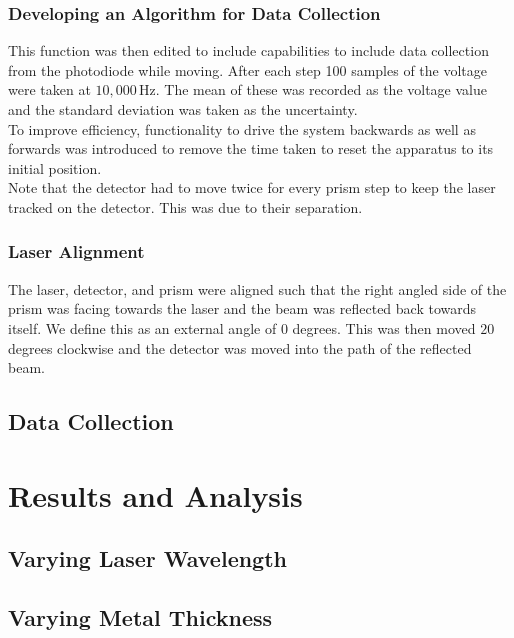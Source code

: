 \documentclass[%
reprint,
amsmath,amssymb,
aps,
]{revtex4-2}
\begin{document}
			\subsubsection{Developing an Algorithm for Data Collection}
				This function was then edited to include capabilities to include data collection from the photodiode while moving. After each step 100 samples of the voltage were taken at $10,000\,\text{Hz}$. The mean of these was recorded as the voltage value and the standard deviation was taken as the uncertainty.\\
				
				To improve efficiency, functionality to drive the system backwards as well as forwards was introduced to remove the time taken to reset the apparatus to its initial position.\\
				
				Note that the detector had to move twice for every prism step to keep the laser tracked on the detector. This was due to their separation.

			\subsubsection{Laser Alignment}
				The laser, detector, and prism were aligned such that the right angled side of the prism was facing towards the laser and the beam was reflected back towards itself. We define this as an external angle of $0$ degrees. This was then moved $20$ degrees clockwise and the detector was moved into the path of the reflected beam.
			
		\subsection{Data Collection}
			\subsubsection{}
		
		
	
	\section{Results and Analysis}
		\subsection{Varying Laser Wavelength}
		
		\subsection{Varying Metal Thickness}
	
\end{document}
